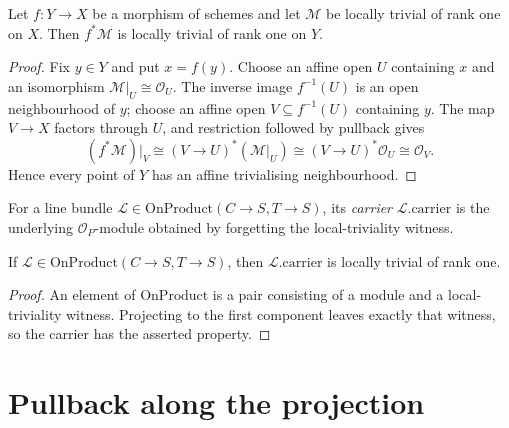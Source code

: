\begin{lemma}\leanok
  \label{lem:IsLocallyTrivial_pullback}
  Let $f:Y\to X$ be a morphism of schemes and let $\mathcal M$ be locally
  trivial of rank one on $X$.  Then $f^*\mathcal M$ is locally trivial of rank
  one on $Y$.
\end{lemma}
\begin{proof}
  \leanok
  Fix $y\in Y$ and put $x=f(y)$.  Choose an affine open $U$ containing $x$
  and an isomorphism $\mathcal M|_U\cong\mathcal O_U$.  The inverse image
  $f^{-1}(U)$ is an open neighbourhood of $y$; choose an affine open
  $V\subseteq f^{-1}(U)$ containing $y$.  The map $V\to X$ factors through
  $U$, and restriction followed by pullback gives
  \[
    (f^*\mathcal M)|_V
      \cong (V\to U)^*(\mathcal M|_U)
      \cong (V\to U)^*\mathcal O_U
      \cong \mathcal O_V.
  \]
  Hence every point of $Y$ has an affine trivialising neighbourhood.
\end{proof}
\begin{definition}\leanok
  \label{def:OnProduct_carrier}
  For a line bundle $\mathcal L\in\mathrm{OnProduct}(C\to S,T\to S)$, its
  \emph{carrier} $\mathcal L.\mathrm{carrier}$ is the underlying
  $\mathcal O_P$-module obtained by forgetting the local-triviality witness.
\end{definition}

\begin{lemma}\leanok
  \label{lem:OnProduct_isLocallyTrivial}
  If $\mathcal L\in\mathrm{OnProduct}(C\to S,T\to S)$, then
  $\mathcal L.\mathrm{carrier}$ is locally trivial of rank one.
\end{lemma}
\begin{proof}
  \leanok
  An element of $\mathrm{OnProduct}$ is a pair consisting of a module and a
  local-triviality witness.  Projecting to the first component leaves exactly
  that witness, so the carrier has the asserted property.
\end{proof}

\section{Pullback along the projection}
\label{sec:lbp_pullback_projection}

